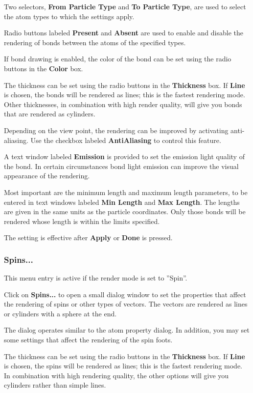\documentclass[11pt]{article}
\begin{document}
Two selectors, {\bf From Particle Type} and {\bf To Particle Type}, are used to 
select the atom types to which the settings apply. 

Radio buttons labeled {\bf Present} and {\bf Absent} are used to enable and
disable the rendering of bonds between the atoms of the specified types.

If bond drawing is enabled, the color of the bond can be set using the radio
buttons in the {\bf Color} box.  

The thickness can be set using the radio buttons in the {\bf Thickness} box.
If {\bf Line} is chosen, the bonds will be rendered as lines; this is the
fastest rendering mode.  Other thicknesses, in combination with high render
quality, will give you bonds that are rendered as cylinders.  

Depending on the view point, the rendering can be improved by activating
anti-aliasing.  Use the checkbox labeled {\bf AntiAliasing} to control 
this feature.

A text window labeled {\bf Emission} is provided to set the emission light
quality of the bond.  In certain circumstances bond light emission can improve
the visual appearance of the rendering.

Most important are the minimum length and maximum length parameters, to be
entered in text windows labeled {\bf Min Length} and {\bf Max Length}.  The
lengths are given in the same units as the particle coordinates.  Only
those bonds will be rendered whose length is within the limits specified.

The setting is effective after {\bf Apply} or {\bf Done} is pressed.

\subsubsection{Spins...}

This menu entry is active if the render mode is set to ''Spin''.

Click on {\bf Spins...} to open a small dialog window to set the properties
that affect the rendering of spins or other types of vectors.  The vectors
are rendered as lines or cylinders with a sphere at the end.

The dialog operates similar to the atom property dialog.  In addition,
you may set some settings that affect the rendering of the spin foots.

The thickness can be set using the radio buttons in the {\bf Thickness} box.
If {\bf Line} is chosen, the spins will be rendered as lines; this is the
fastest rendering mode.  In combination with high rendering quality, the
other options will give you cylinders rather than simple lines.
\end{document}
